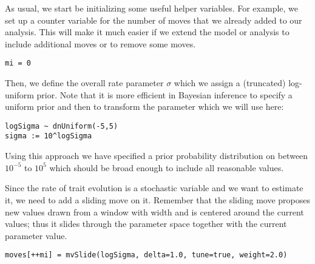
As usual, we start be initializing some useful helper variables.
For example, we set up a counter variable for the number of moves that we already added to our analysis.
This will make it much easier if we extend the model or analysis to include additional moves or to remove some moves.
{\tt \begin{snugshade*}
\begin{lstlisting}
mi = 0 
\end{lstlisting}
\end{snugshade*}}

Then, we define the overall rate parameter $\sigma$ which we assign a (truncated) log-uniform prior. Note that it is more efficient in Bayesian inference to specify a uniform prior and then to transform the parameter which we will use here:
{\tt \small \begin{snugshade*}
\begin{lstlisting}
logSigma ~ dnUniform(-5,5)
sigma := 10^logSigma
\end{lstlisting}
\end{snugshade*}}
Using this approach we have specified a prior probability distribution on  between $10^{-5}$ to $10^5$ which should be broad enough to include all reasonable values.

Since the rate of trait evolution  is a stochastic variable and we want to estimate it, we need to add a sliding move on it. Remember that the sliding move proposes new values drawn from a window with width  and is centered around the current values; thus it slides through the parameter space together with the current parameter value.
{\tt \small \begin{snugshade*}
\begin{lstlisting}
moves[++mi] = mvSlide(logSigma, delta=1.0, tune=true, weight=2.0)
\end{lstlisting}
\end{snugshade*}}

